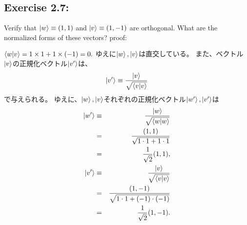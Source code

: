 \begin{flushleft}
\setcounter{equation}{0}
\section{\Large Exercise 2.7:}
Verify that $\ket{w} \equiv (1, 1)$ and $\ket{v} \equiv (1, -1)$ are orthogonal.
What are the normalized forms of these vectors?
\newline
\vspace{0.2in}
{\large proof:}

$\braket{w|v} = 1 \times 1 + 1 \times (-1) = 0.$
\newline
ゆえに$\ket{w}, \ket{v}$は直交している。
また、ベクトル$\ket{v}$の正規化ベクトル$\ket{v'}$は、
\begin{equation}
\ket{v'} \equiv \frac{\ket{v}}{\sqrt{\braket{v|v}}}
\end{equation}
で与えられる。
\newline
ゆえに、$\ket{w}, \ket{v}$それぞれの正規化ベクトル$\ket{w'}, \ket{v'}$は
\begin{eqnarray*}
\ket{w'} &\equiv& \frac{\ket{w}}{\sqrt{\braket{w|w}}}\\
&=& \frac{(1, 1)}{\sqrt{1 \cdot 1 + 1 \cdot 1}}\\
&=&  \frac{1}{\sqrt{2}}(1, 1),\\
\ket{v'} &\equiv& \frac{\ket{v}}{\sqrt{\braket{v|v}}}\\
&=& \frac{(1, -1)}{\sqrt{1 \cdot 1 + (-1) \cdot (-1)}}\\
&=&  \frac{1}{\sqrt{2}}(1, -1).
\end{eqnarray*}
\end{flushleft}
